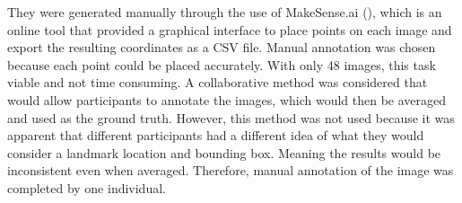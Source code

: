 \documentclass{l4proj}
\begin{document}

They were generated manually through the use of MakeSense.ai (\cite{makesense}), which is an online tool that provided a graphical interface to place points on each image and export the resulting coordinates as a CSV file. Manual annotation was chosen because each point could be placed accurately. With only 48 images, this task viable and not time consuming. A collaborative method was considered that would allow participants to annotate the images, which would then be averaged and used as the ground truth. However, this method was not used because it was apparent that different participants had a different idea of what they would consider a landmark location and bounding box. Meaning the results would be inconsistent even when averaged. Therefore, manual annotation of the image was completed by one individual.
\end{document}
